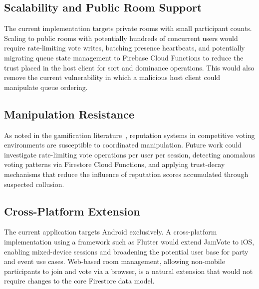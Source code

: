 \documentclass[pdflatex,sn-mathphys-num,iicol]{sn-jnl}
\theoremstyle{thmstyleone}%
\theoremstyle{thmstyletwo}%
\theoremstyle{thmstylethree}%
\begin{document}
\subsection{Scalability and Public Room Support}

The current implementation targets private rooms with small participant counts.
Scaling to public rooms with potentially hundreds of concurrent users would require
rate-limiting vote writes, batching presence heartbeats, and potentially migrating
queue state management to Firebase Cloud Functions to reduce the trust placed in
the host client for sort and dominance operations. This would also remove the
current vulnerability in which a malicious host client could manipulate queue
ordering.

\subsection{Manipulation Resistance}

As noted in the gamification literature~\cite{jamvote_online_community_motivation,
jamvote_gamification_works}, reputation systems in competitive voting environments
are susceptible to coordinated manipulation. Future work could investigate
rate-limiting vote operations per user per session, detecting anomalous voting
patterns via Firestore Cloud Functions, and applying trust-decay mechanisms that
reduce the influence of reputation scores accumulated through suspected collusion.

\subsection{Cross-Platform Extension}

The current application targets Android exclusively. A cross-platform implementation
using a framework such as Flutter would extend JamVote to iOS, enabling mixed-device
sessions and broadening the potential user base for party and event use cases.
Web-based room management, allowing non-mobile participants to join and vote via a
browser, is a natural extension that would not require changes to the core Firestore
data model.
\end{document}
